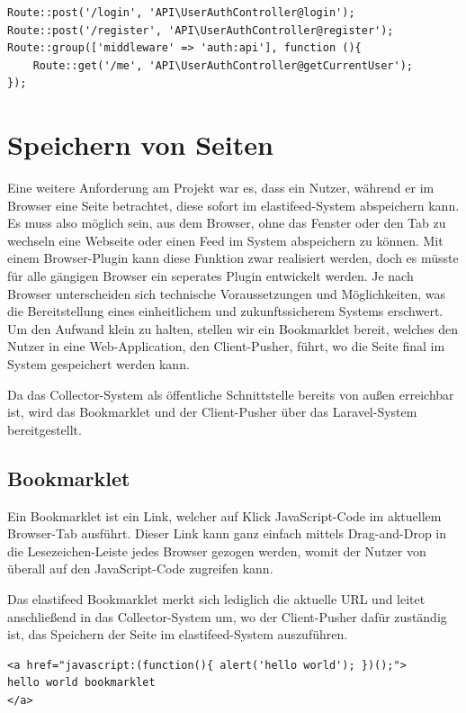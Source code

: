             \begin{lstlisting}
Route::post('/login', 'API\UserAuthController@login');
Route::post('/register', 'API\UserAuthController@register');
Route::group(['middleware' => 'auth:api'], function (){
    Route::get('/me', 'API\UserAuthController@getCurrentUser');
});
            \end{lstlisting}


\section{Speichern von Seiten}
    Eine weitere Anforderung am Projekt war es, dass ein Nutzer, während er im Browser eine Seite betrachtet, diese sofort im elastifeed-System abspeichern kann. Es muss also möglich sein, aus dem Browser, ohne das Fenster oder den Tab zu wechseln eine Webseite oder einen Feed im System abspeichern zu können. Mit einem Browser-Plugin kann diese Funktion zwar realisiert werden, doch es müsste für alle gängigen Browser ein seperates Plugin entwickelt werden. Je nach Browser unterscheiden sich technische Voraussetzungen und Möglichkeiten, was die Bereitstellung eines einheitlichem und zukunftssicherem Systems erschwert. Um den Aufwand klein zu halten, stellen wir ein Bookmarklet bereit, welches den Nutzer in eine Web-Application, den Client-Pusher, führt, wo die Seite final im System gespeichert werden kann.
    
    Da das Collector-System als öffentliche Schnittstelle bereits von außen erreichbar ist, wird das Bookmarklet und der Client-Pusher über das Laravel-System bereitgestellt.
    
    \subsection{Bookmarklet}
        Ein Bookmarklet ist ein Link, welcher auf Klick JavaScript-Code im aktuellem Browser-Tab ausführt. Dieser Link kann ganz einfach mittels Drag-and-Drop in die Lesezeichen-Leiste jedes Browser gezogen werden, womit der Nutzer von überall auf den JavaScript-Code zugreifen kann.
        
        Das elastifeed Bookmarklet merkt sich lediglich die aktuelle URL und leitet anschließend in das Collector-System um, wo der Client-Pusher dafür zuständig ist, das Speichern der Seite im elastifeed-System auszuführen.
        
        \begin{lstlisting}[caption=HTML Aufbau eines Bookmarklet]
<a href="javascript:(function(){ alert('hello world'); })();">
hello world bookmarklet
</a>
        \end{lstlisting}

